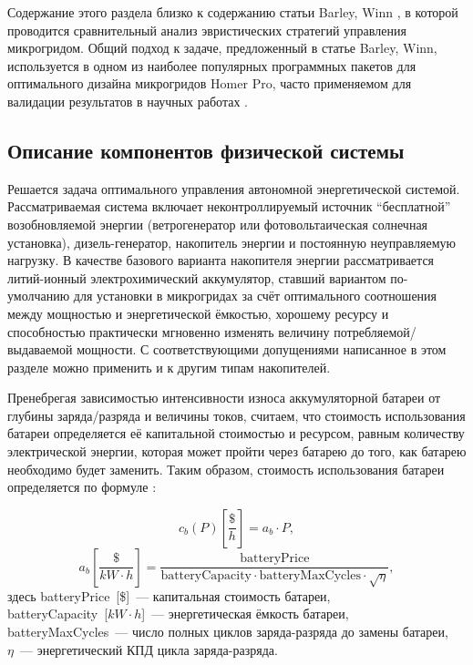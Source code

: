 Содержание этого раздела близко к содержанию статьи Barley, Winn \cite{Barley1996}, в которой проводится сравнительный анализ эвристических стратегий управления микрогридом. 
Общий подход к задаче, предложенный в статье Barley, Winn, используется в одном из наиболее популярных программных пакетов для оптимального дизайна микрогридов Homer Pro, часто применяемом для валидации результатов в научных работах \cite{Berendes2018, Aziz2019, Petersen2018, Olatomiwa2016}.

\subsection{Описание компонентов физической системы}
\label{sec:system_definition}

Решается задача оптимального управления автономной энергетической системой.\\
Рассматриваемая система включает неконтроллируемый источник ``бесплатной'' возобновляемой энергии  (ветрогенератор или фотовольтаическая солнечная установка), дизель-генератор, накопитель энергии и постоянную неуправляемую нагрузку.
В качестве базового варианта накопителя энергии рассматривается литий-ионный электрохимический аккумулятор, ставший вариантом по-умолчанию для установки в микрогридах за счёт оптимального соотношения между мощностью и энергетической ёмкостью, хорошему ресурсу и способностью практически мгновенно изменять величину потребляемой/выдаваемой мощности.
С соответствующими допущениями написанное в этом разделе можно применить и к другим типам накопителей. 

Пренебрегая зависимостью интенсивности износа аккумуляторной батареи от глубины заряда/разряда и величины токов, считаем, что стоимость использования батареи определяется её капитальной стоимостью и ресурсом, равным количеству электрической энергии, которая может пройти через батарею до того, как батарею необходимо будет заменить.
Таким образом, стоимость использования батареи определяется по формуле \cite{bwc}:


\begin{equation}\label{f:cb}
c_b(P) \left[\frac{\$}{h} \right] = 
a_b \cdot P,
\end{equation}
\begin{equation}\label{f:ab}
a_b \left[ \frac{\$}{kW\cdot h} \right] =
\frac{\text{batteryPrice}}{\text{batteryCapacity} \cdot \text{batteryMaxCycles} 
\cdot \sqrt{\eta}} ,
\end{equation}
здесь batteryPrice~[\$]~--- капитальная стоимость батареи,\\
batteryCapacity~[$kW\cdot h$]~--- энергетическая ёмкость батареи,\\
batteryMaxCycles~--- число полных циклов заряда-разряда до замены батареи,\\
$\eta$~--- энергетический КПД цикла заряда-разряда.

